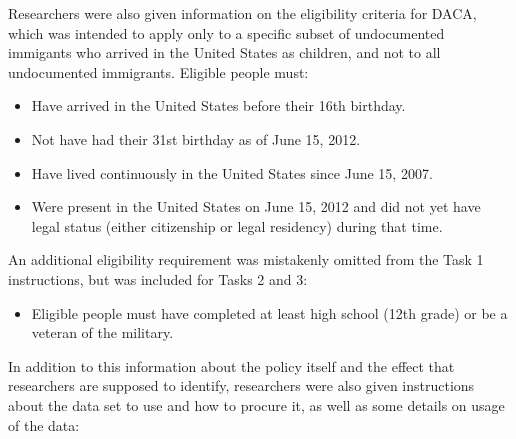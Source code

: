 \documentclass[
  letterpaper,
  DIV=11,
  numbers=noendperiod]{scrartcl}
\providecommand{\tightlist}{%
  \setlength{\itemsep}{0pt}\setlength{\parskip}{0pt}}\usepackage{longtable,booktabs,array}
\begin{document}
Researchers were also given information on the eligibility criteria for
DACA, which was intended to apply only to a specific subset of
undocumented immigants who arrived in the United States as children, and
not to all undocumented immigrants. Eligible people must:

\begin{itemize}
\item
  Have arrived in the United States before their 16th birthday.
\item
  Not have had their 31st birthday as of June 15, 2012.
\item
  Have lived continuously in the United States since June 15, 2007.
\item
  Were present in the United States on June 15, 2012 and did not yet
  have legal status (either citizenship or legal residency) during that
  time.
\end{itemize}

An additional eligibility requirement was mistakenly omitted from the
Task 1 instructions, but was included for Tasks 2 and 3:

\begin{itemize}
\tightlist
\item
  Eligible people must have completed at least high school (12th grade)
  or be a veteran of the military.
\end{itemize}

In addition to this information about the policy itself and the effect
that researchers are supposed to identify, researchers were also given
instructions about the data set to use and how to procure it, as well as
some details on usage of the data:
\end{document}
